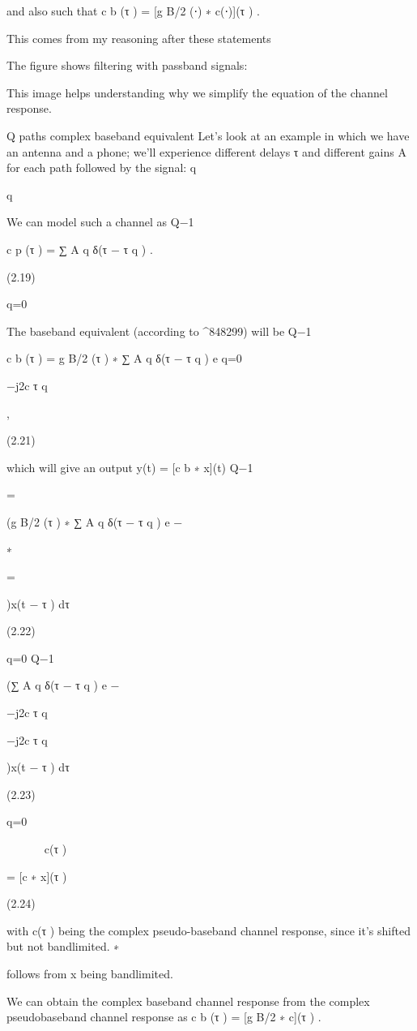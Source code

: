 {and also such that c b (τ ) = [g B/2 (⋅) ∗ c(⋅)](τ ) .

This comes from my reasoning after these statements

The figure shows filtering with passband signals:

This image helps understanding why we simplify the equation of the channel response.

Q paths complex baseband equivalent Let's look at an example in which we have an antenna and a phone; we'll experience different delays τ and different gains A for each path followed by the signal:
q

q

We can model such a channel as Q−1

c p (τ ) = ∑ A q δ(τ − τ q ) .

(2.19)

q=0

The baseband equivalent (according to ^848299) will be Q−1

c b (τ ) = g B/2 (τ ) ∗ ∑ A q δ(τ − τ q ) e q=0

−j2\pif c τ q

,

(2.21)

which will give an output y(t) = [c b ∗ x](t)
Q−1

\infty

= \int

(g B/2 (τ ) ∗ ∑ A q δ(τ − τ q ) e
−\infty

∗

\infty

= \int

)x(t − τ ) dτ

(2.22)

q=0 Q−1

(∑ A q δ(τ − τ q ) e
−\infty

−j2\pif c τ q

−j2\pif c τ q

)x(t − τ ) dτ

(2.23)

q=0






c(τ )

= [c ∗ x](τ )

(2.24)

with c(τ ) being the complex pseudo-baseband channel response, since it's shifted but not bandlimited.
∗

follows from x being bandlimited.

We can obtain the complex baseband channel response from the complex pseudobaseband channel response as c b (τ ) = [g B/2 ∗ c](τ ) .

}
